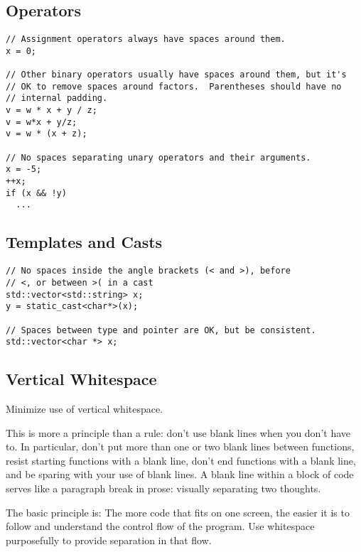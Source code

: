     \subsection{Operators}
    \begin{verbatim}
// Assignment operators always have spaces around them.
x = 0;

// Other binary operators usually have spaces around them, but it's
// OK to remove spaces around factors.  Parentheses should have no
// internal padding.
v = w * x + y / z;
v = w*x + y/z;
v = w * (x + z);

// No spaces separating unary operators and their arguments.
x = -5;
++x;
if (x && !y)
  ...

    \end{verbatim}
    \subsection{Templates and Casts}
    \begin{verbatim}
// No spaces inside the angle brackets (< and >), before
// <, or between >( in a cast
std::vector<std::string> x;
y = static_cast<char*>(x);

// Spaces between type and pointer are OK, but be consistent.
std::vector<char *> x;
    \end{verbatim}
    \subsection{Vertical Whitespace}
    Minimize use of vertical whitespace.

    This is more a principle than a rule: don't use blank lines when you don't have to. In particular, don't put more than one or two blank lines between functions, resist starting functions with a blank line, don't end functions with a blank line, and be sparing with your use of blank lines. A blank line within a block of code serves like a paragraph break in prose: visually separating two thoughts.

    The basic principle is: The more code that fits on one screen, the easier it is to follow and understand the control flow of the program. Use whitespace purposefully to provide separation in that flow.

